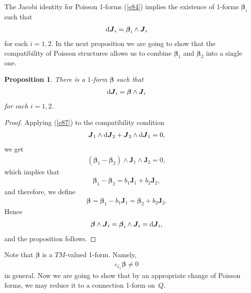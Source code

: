 \documentclass[10pt,a4paper]{amsart}
\numberwithin{equation}{section}
\newtheorem{Proposition}[Theorem]{Proposition}
 { \theoremstyle{definition}
\newtheorem{Definition}[Theorem]{Definition} }
\begin{document}
The Jacobi identity for Poisson 1-forms (\ref{e84}) implies the existence of 1-forms $\boldsymbol{\beta }_{i}$ such that
\begin{gather}
{\rm d}\boldsymbol{J}_{i}=\boldsymbol{\beta }_{i}\wedge \boldsymbol{J}_{i} \label{e87}
\end{gather}
for each $i=1,2$. In the next proposition we are going to show that the compatibility of Poisson structures allows us to combine $\boldsymbol{\beta }_{1} $ and $\boldsymbol{\beta }_{2}$ into a single one.

\begin{Proposition}\label{proposition5}
There is a $1$-form $\boldsymbol{\beta }$ such that
\begin{gather*}
{\rm d}\boldsymbol{J}_{i}=\boldsymbol{\beta }\wedge \boldsymbol{J}_{i} %
\end{gather*}
for each $i=1,2$.
\end{Proposition}

\begin{proof}
Applying (\ref{e87}) to the compatibility condition
\begin{gather*}
\boldsymbol{J}_{1}\wedge {\rm d}\boldsymbol{J}_{2}+\boldsymbol{J}_{2}\wedge {\rm d}\boldsymbol{J}_{1}=0,
\end{gather*}
we get
\begin{gather*}
 ( \boldsymbol{\beta }_{1}-\boldsymbol{\beta }_{2} ) \wedge \boldsymbol{J}_{1}\wedge \boldsymbol{J}_{2}=0,
\end{gather*}
which implies that
\begin{gather*}
\boldsymbol{\beta }_{1}-\boldsymbol{\beta }_{2}=b_{1}\boldsymbol{J}_{1}+b_{2}\boldsymbol{J}_{2},
\end{gather*}
and therefore, we def\/ine
\begin{gather*}
\boldsymbol{\beta }=\boldsymbol{\beta }_{1}-b_{1}\boldsymbol{J}_{1}=\boldsymbol{\beta }_{2}+b_{2}\boldsymbol{J}_{2}.
\end{gather*}
Hence
\begin{gather*}
\boldsymbol{\beta }\wedge \boldsymbol{J}_{i}=\boldsymbol{\beta }_{i}\wedge \boldsymbol{J}_{i}={\rm d}\boldsymbol{J}_{i},
\end{gather*}
and the proposition follows.
\end{proof}

Note that $\boldsymbol{\beta }$ is a $TM$-valued 1-form. Namely,
\begin{gather*}
\iota _{\widehat{e}_{1}}\boldsymbol{\beta }\neq 0
\end{gather*}
in general. Now we are going to show that by an appropriate change of Poisson forms, we may reduce it to a connection 1-form on~$Q$.
\end{document}
